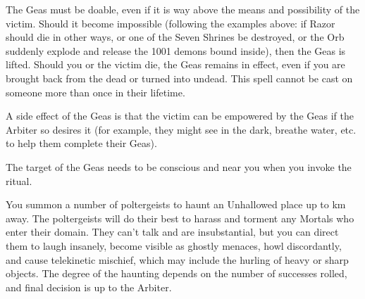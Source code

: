 {

The Geas must be doable, even if it is way above the means and possibility of the victim.  Should it become impossible (following the examples above: if Razor should die in other ways, or one of the Seven Shrines be destroyed, or the Orb suddenly explode and release the 1001 demons bound inside), then the Geas is lifted.  Should you or the victim die, the Geas remains in effect, even if you are brought back from the dead or turned into undead. This spell cannot be cast on someone more than once in their lifetime.

A side effect of the Geas is that the victim can be empowered by the Geas if the Arbiter so desires it (for example, they might see in the dark, breathe water, etc. to help them complete their Geas).

The target of the Geas needs to be conscious and near you when you invoke the ritual.

\OCCULT[
  Name=Haunt,
  Link=occultism-haunt,
  Success=3,
  Cost=666,
  Widdershins=0
]

You summon a number of poltergeists to haunt an Unhallowed place up to \LVL km away.  The poltergeists will do their best to harass and torment any Mortals who enter their domain. They can't talk and are insubstantial, but you can direct them to laugh insanely, become visible as ghostly menaces, howl discordantly, and cause telekinetic mischief, which may include the hurling of heavy or sharp objects.  The degree of the haunting depends on the number of successes rolled, and final decision is up to the Arbiter.

\OCCULT[
  Name=Hekaphage,
  Link=occultism-hekaphage,
  Success=2,
  Cost=varies,
  Widdershins=0
]

}
